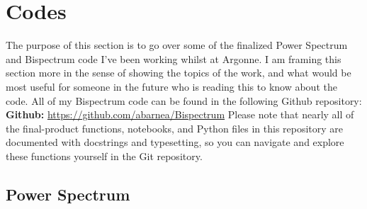 \documentclass[11pt]{article}
\renewcommand{\_}[1]{\underline{ #1 }}
\newcommand{\npar}{\vspace{.3cm}\newline}
\begin{document}
{\section{Codes}\label{code}

The purpose of this section is to go over some of the finalized Power Spectrum and Bispectrum code I've been working whilst at Argonne. I am framing this section more in the sense of showing the topics of the work, and what would be most useful for someone in the future who is reading this to know about the code. All of my Bispectrum code can be found in the following Github repository:
\npar
\textbf{Github:} \href{https://github.com/abarnea/Bispectrum}{https://github.com/abarnea/Bispectrum}
\npar
Please note that nearly all of the final-product functions, notebooks, and Python files in this repository are documented with docstrings and typesetting, so you can navigate and explore these functions yourself in the Git repository.

\subsection{Power Spectrum}\label{pscode}

}
\end{document}
